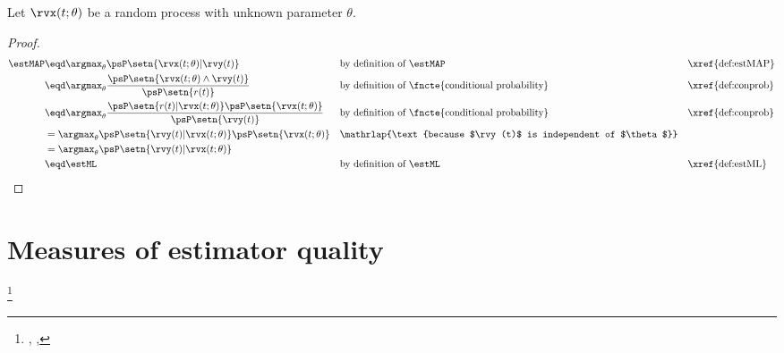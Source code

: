 \begin{theorem}
\label{thm:map=ml}
Let $\rvx(t;\theta)$ be a random process with unknown parameter $\theta$.
\end{theorem}
\begin{proof}
\begin{align*}
   \estMAP
     &\eqd \argmax_{\theta} \psP\setn{\rvx(t;\theta)|\rvy(t)}
     &&    \text{by definition of $\estMAP$}
     &&    \text{\xref{def:estMAP}}
   \\&\eqd \argmax_{\theta} \frac{\psP\setn{\rvx(t;\theta) \land \rvy(t)}}
                               {\psP\setn{r(t)}}
     && \text{by definition of \fncte{conditional probability}}
     && \text{\xref{def:conprob}}
   \\&\eqd \argmax_{\theta} \frac{\psP\setn{r(t) | \rvx(t;\theta) }\psP\setn{\rvx(t;\theta) }}
                               {\psP\setn{\rvy(t)}}
     && \text{by definition of \fncte{conditional probability}}
     && \text{\xref{def:conprob}}
   \\&=    \argmax_{\theta} \psP\setn{\rvy(t) | \rvx(t;\theta) }\psP\setn{\rvx(t;\theta)}
     &&\mathrlap{\text{because $\rvy(t)$ is independent of $\theta$}}
   \\&=    \argmax_{\theta} \psP\setn{\rvy(t) | \rvx(t;\theta) }
   \\&\eqd \estML
     &&  \text{by definition of $\estML$}
     &&  \text{\xref{def:estML}}
\end{align*}
\end{proof}

\section{Measures of estimator quality}
\label{sec:quality}
\begin{definition}
\footnote{
  ,
  ,
  }
\label{def:mse}
\end{definition}

